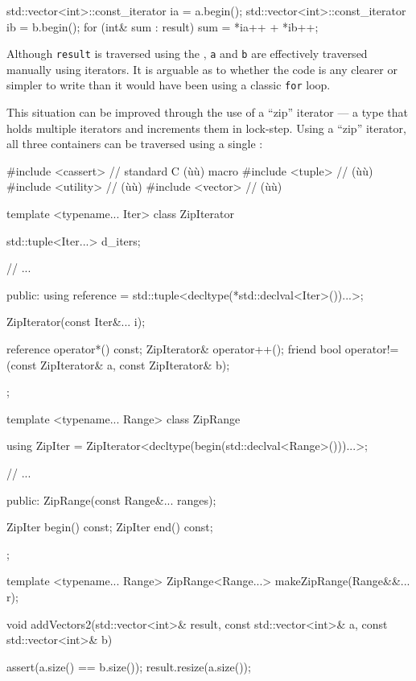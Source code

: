 {{{\begin{emcppslisting}
{    std::vector<int>::const_iterator ia = a.begin();
    std::vector<int>::const_iterator ib = b.begin();
    for (int& sum : result)
    {
        sum = *ia++ + *ib++;
    }
}
\end{emcppslisting}


\noindent Although \lstinline!result! is traversed using the , \lstinline!a! and \lstinline!b! are effectively traversed
manually using iterators. It is arguable as to whether the code is any
clearer or simpler to write than it would have been using a classic
\lstinline!for! loop.

This situation can be improved through the use of a ``zip'' iterator ---
a type that holds multiple iterators and increments them in lock-step.
Using a ``zip'' iterator, all three containers can be traversed using a
single :

\begin{emcppslisting}
#include <cassert>  // standard C (ù{}ù) macro
#include <tuple>    // (ù{}ù)
#include <utility>  // (ù{}ù)
#include <vector>   // (ù{}ù)

template <typename... Iter>
class ZipIterator
{
    std::tuple<Iter...> d_iters;

    // ...

public:
    using reference = std::tuple<decltype(*std::declval<Iter>())...>;

    ZipIterator(const Iter&... i);

    reference operator*() const;
    ZipIterator& operator++();
    friend bool operator!=(const ZipIterator& a, const ZipIterator& b);
};

template <typename... Range>
class ZipRange
{
    using ZipIter =
        ZipIterator<decltype(begin(std::declval<Range>()))...>;

    // ...

public:
    ZipRange(const Range&... ranges);

    ZipIter begin() const;
    ZipIter end() const;
};

template <typename... Range>
ZipRange<Range...> makeZipRange(Range&&... r);

void addVectors2(std::vector<int>&       result,
                 const std::vector<int>& a,
                 const std::vector<int>& b)
{
    assert(a.size() == b.size());
    result.resize(a.size());

}
\end{emcppslisting}}}}
